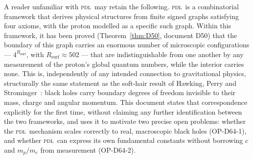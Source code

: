 \documentclass[12pt,a4paper]{article}
\newcommand{\PDL}{\textsc{pdl}}
\newcommand{\Rsurf}{R_{\mathrm{surf}}}
\begin{document}
A reader unfamiliar with \PDL\ may retain the following. \PDL\ is a combinatorial framework that derives physical structures from finite signed graphs satisfying four axioms, with the proton modelled as a specific such graph. Within this framework, it has been proved (Theorem~\ref{thm:D50}, document D50) that the boundary of this graph carries an enormous number of microscopic configurations --- $4^{\Rsurf}$, with $\Rsurf\approx502$ --- that are indistinguishable from one another by any measurement of the proton's global quantum numbers, while the interior carries none. This is, independently of any intended connection to gravitational physics, structurally the same statement as the soft-hair result of Hawking, Perry and Strominger~\cite{HPS2016,HPS2017}: black holes carry boundary degrees of freedom invisible to their mass, charge and angular momentum. This document states that correspondence explicitly for the first time, without claiming any further identification between the two frameworks, and uses it to motivate two precise open problems: whether the \PDL\ mechanism scales correctly to real, macroscopic black holes (OP-D64-1), and whether \PDL\ can express its own fundamental constants without borrowing $c$ and $m_p/m_e$ from measurement (OP-D64-2).

\clearpage



\end{document}

